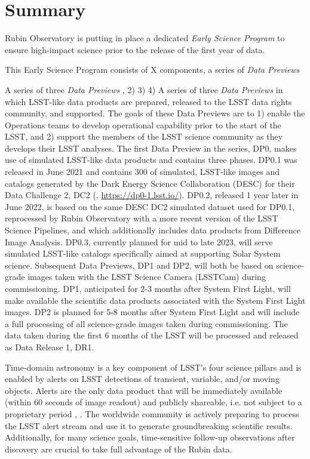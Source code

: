 \section{Summary}

Rubin Observatory is putting in place a dedicated {\it Early Science Program} to ensure high-impact science prior to the release of the first year of \lsst data.

This Early Science Program consists of X components, a series of \emph{Data Previews}

A series of  three \emph{Data Previews} , 2) 3) 4) 
A series of  three \emph{Data Previews} in which LSST-like data products are prepared, released to the LSST data rights community, and supported.
The goals of these Data Previews are to 1) enable the Operations teams to develop operational capability prior to the start of the LSST, and 2) support the members of the LSST science community as they develops their LSST analyses.
The first Data Preview in the series, DP0, makes use of simulated LSST-like data products and contains three phases.
DP0.1 was released in June 2021 and contains 300 \sqdeg of simulated, LSST-like images and catalogs generated by the Dark Energy Science Collaboration (DESC) for their Data Challenge 2, DC2 (\citep{2021ApJS..253...31L}, \url{https://dp0-1.lsst.io/}).
DP0.2, released 1 year later in June 2022, is based on the same DESC DC2 simulated dataset used for DP0.1, reprocessed by Rubin Observatory with a more recent version of the LSST Science Pipelines, and which additionally includes data products from Difference Image Analysis. 
DP0.3, currently planned for mid to late 2023, will serve simulated LSST-like catalogs specifically aimed at supporting Solar System science. 
Subsequent Data Previews, DP1 and DP2, will both be based on science-grade images taken with the LSST Science Camera (LSSTCam) during commissioning. 
DP1, anticipated for 2-3 months after System First Light, will make available the scientific data products associated with the System First Light images. 
DP2 is planned for 5-8 months after System First Light and will include a full processing of all science-grade images taken during commissioning. 
The data taken during the first 6 months of the LSST will be processed and released as Data Release 1, DR1.


Time-domain astronomy is a key component of LSST's four science pillars and is enabled by alerts on LSST detections of transient, variable, and/or moving objects.
Alerts are the only data product that will be immediately available (within 60 seconds of image readout) and publicly shareable, i.e. not subject to a proprietary period \citep{LSE-163},  \citep{RDO-013}.
The worldwide community is actively preparing to process the LSST alert stream and use it to generate groundbreaking scientific results. Additionally, for many science goals, time-sensitive follow-up observations after discovery are crucial to take full advantage of the Rubin data.


